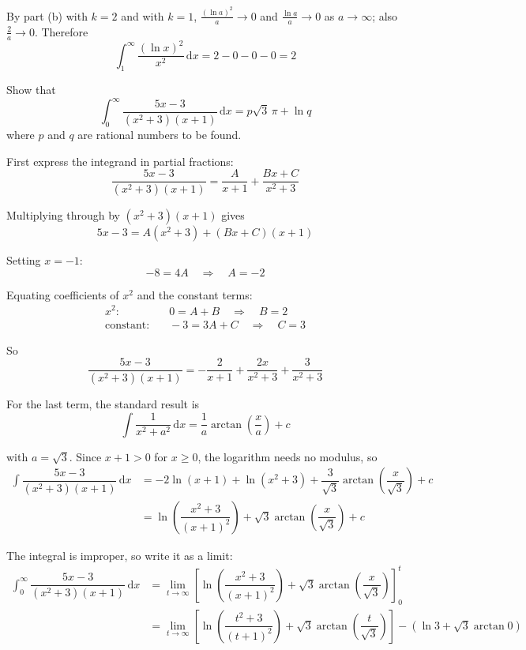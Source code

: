 \documentclass[leqno]{article}
\begin{document}
\begin{enumerate}[
  label=\textbf{\arabic*.},
  leftmargin=*,
  topsep=0pt,
  partopsep=0pt,
  parsep=0pt
]
\begin{djsSolution}
\begin{enumerate}[label=\textbf{(\alph*)}, start=1]
By part (b) with \(k=2\) and with \(k=1\), \(\frac{(\ln a)^2}{a}\to 0\) and \(\frac{\ln a}{a}\to 0\) as \(a\to\infty\); also \(\frac{2}{a}\to 0\). Therefore
\[
\int_1^{\infty} \frac{(\ln x)^2}{x^2}\,\mathrm{d}x = 2 - 0 - 0 - 0 = 2
\]

\end{enumerate}
\end{djsSolution}

\newpage

\questionitem

Show that
\[\int_0^{\infty} \dfrac{5x-3}{(x^2+3)(x+1)}\,\mathrm{d}x = p\sqrt{3}\,\pi + \ln q\]
where $p$ and $q$ are rational numbers to be found.  \\

\vspace*{10pt}

\begin{djsSolution}
First express the integrand in partial fractions:
\[
\dfrac{5x-3}{(x^2+3)(x+1)}=\dfrac{A}{x+1}+\dfrac{Bx+C}{x^2+3}
\]

Multiplying through by \((x^2+3)(x+1)\) gives
\[
5x-3=A(x^2+3)+(Bx+C)(x+1)
\]

Setting \(x=-1\):
\[
-8=4A\quad\Longrightarrow\quad A=-2
\]

Equating coefficients of \(x^2\) and the constant terms:
\begin{align*}
x^2:&\quad 0=A+B\quad\Longrightarrow\quad B=2\\
\text{constant}:&\quad -3=3A+C\quad\Longrightarrow\quad C=3
\end{align*}

So
\[
\dfrac{5x-3}{(x^2+3)(x+1)}=-\dfrac{2}{x+1}+\dfrac{2x}{x^2+3}+\dfrac{3}{x^2+3}
\]

For the last term, the standard result is
\[
\int\dfrac{1}{x^2+a^2}\,\mathrm{d}x=\dfrac{1}{a}\arctan\left(\dfrac{x}{a}\right)+c
\]

with \(a=\sqrt{3}\). Since \(x+1>0\) for \(x\ge 0\), the logarithm needs no modulus, so
\begin{align*}
\int\dfrac{5x-3}{(x^2+3)(x+1)}\,\mathrm{d}x&=-2\ln(x+1)+\ln(x^2+3)+\dfrac{3}{\sqrt{3}}\arctan\left(\dfrac{x}{\sqrt{3}}\right)+c\\
&=\ln\left(\dfrac{x^2+3}{(x+1)^2}\right)+\sqrt{3}\arctan\left(\dfrac{x}{\sqrt{3}}\right)+c
\end{align*}

The integral is improper, so write it as a limit:
\begin{align*}
\int_0^{\infty}\dfrac{5x-3}{(x^2+3)(x+1)}\,\mathrm{d}x&=\lim_{t\to\infty}\left[\ln\left(\dfrac{x^2+3}{(x+1)^2}\right)+\sqrt{3}\arctan\left(\dfrac{x}{\sqrt{3}}\right)\right]_0^{t}\\
&=\lim_{t\to\infty}\left[\ln\left(\dfrac{t^2+3}{(t+1)^2}\right)+\sqrt{3}\arctan\left(\dfrac{t}{\sqrt{3}}\right)\right]-\left(\ln 3+\sqrt{3}\arctan 0\right)
\end{align*}


\end{djsSolution}
\end{enumerate}
\end{document}
